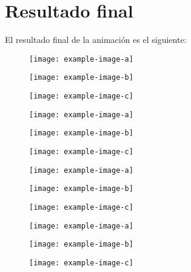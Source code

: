 \section{Resultado final}

El resultado final de la animación es el siguiente:

\begin{figure}[H]
    \centering
   \texttt{[image: example-image-a]}
\end{figure}
\begin{figure}[H]
    \centering
   \texttt{[image: example-image-b]}
\end{figure}
\begin{figure}[H]
    \centering
   \texttt{[image: example-image-c]}
\end{figure}

\begin{figure}[H]
    \centering
   \texttt{[image: example-image-a]}
\end{figure}
\begin{figure}[H]
    \centering
   \texttt{[image: example-image-b]}
\end{figure}
\begin{figure}[H]
    \centering
   \texttt{[image: example-image-c]}
\end{figure}

\begin{figure}[H]
    \centering
   \texttt{[image: example-image-a]}
\end{figure}
\begin{figure}[H]
    \centering
   \texttt{[image: example-image-b]}
\end{figure}
\begin{figure}[H]
    \centering
   \texttt{[image: example-image-c]}
\end{figure}

\begin{figure}[H]
    \centering
   \texttt{[image: example-image-a]}
\end{figure}
\begin{figure}[H]
    \centering
   \texttt{[image: example-image-b]}
\end{figure}
\begin{figure}[H]
    \centering
   \texttt{[image: example-image-c]}
\end{figure}
